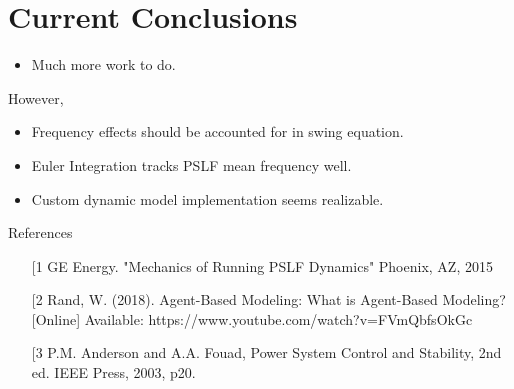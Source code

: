 \documentclass[14pt, unknownkeysallowed]{beamer}
\begin{document}
\section{Current Conclusions}
\begin{frame}
\begin{itemize}
	\item Much more work to do.
\end{itemize}
However,
\begin{itemize}
	\item Frequency effects should be accounted for in swing equation.
	\item Euler Integration tracks PSLF mean frequency well.
	\item Custom dynamic model implementation seems realizable. 
\end{itemize}
\end{frame}

\begin{frame}
References\vspace{1em}\\
\begin{minipage}{\textwidth}
	\footnotesize
	\begin{itemize}
	\item[[1] GE Energy. "Mechanics of Running PSLF Dynamics" Phoenix, AZ, 2015
	\item[[2] Rand, W. (2018). Agent-Based Modeling: What is Agent-Based Modeling? [Online] Available: https://www.youtube.com/watch?v=FVmQbfsOkGc
	\item[[3] P.M. Anderson and A.A. Fouad, Power System Control and Stability, 2nd ed. IEEE Press, 2003, p20.
\end{itemize}
\end{minipage}
\end{frame}
\end{document}
